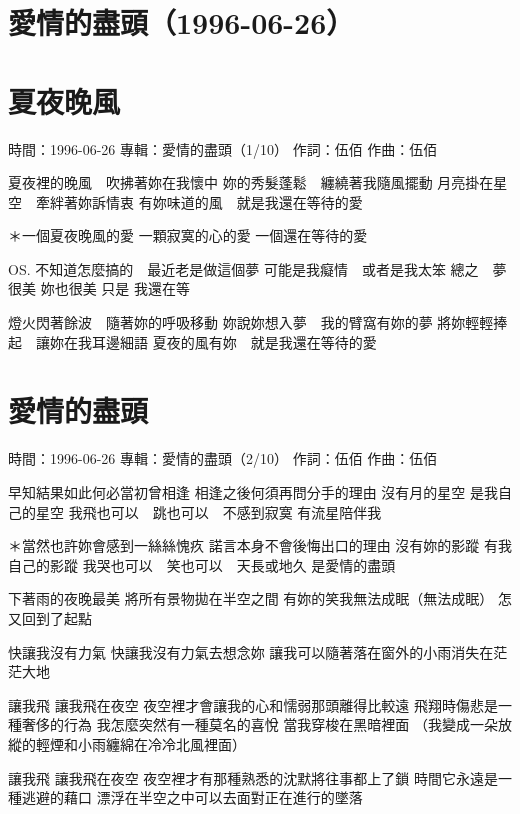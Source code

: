 \documentclass[UTF8,a4paper,oneside,twocolumn,12pt]{ctexbook}
\newcommand{\infopair}[2]{\textbullet #1：#2}
\newcommand{\zc}[1][伍佰]{\infopair{作詞}{#1}}
\newcommand{\zq}[1][伍佰]{\infopair{作曲}{#1}}
\newcommand{\zj}[1]{\infopair{專輯}{#1}}
\newcommand{\sj}[1]{\infopair{時間}{#1}}
\newenvironment{info}{\begin{flushleft}\kaishu
	}
	{\end{flushleft}\normalsize\yahei\par}
\newenvironment{lyric}{
	}
{}
\begin{document}
\section*{愛情的盡頭（1996-06-26）}
\section{夏夜晚風}
\begin{info}
	\sj{1996-06-26}
	\zj{愛情的盡頭（1/10）}
	\zc
	\zq
\end{info}
\begin{lyric}
	夏夜裡的晚風　吹拂著妳在我懷中
	妳的秀髮蓬鬆　纏繞著我隨風擺動
	月亮掛在星空　牽絆著妳訴情衷
	有妳味道的風　就是我還在等待的愛

	＊一個夏夜晚風的愛
	一顆寂寞的心的愛
	一個還在等待的愛

	OS.
	不知道怎麼搞的　最近老是做這個夢
	可能是我癡情　或者是我太笨
	總之　夢很美
	妳也很美
	只是
	我還在等

	燈火閃著餘波　隨著妳的呼吸移動
	妳說妳想入夢　我的臂窩有妳的夢
	將妳輕輕捧起　讓妳在我耳邊細語
	夏夜的風有妳　就是我還在等待的愛
\end{lyric}

\section{愛情的盡頭}
\begin{info}
	\sj{1996-06-26}
	\zj{愛情的盡頭（2/10）}
	\zc
	\zq
\end{info}
\begin{lyric}
	早知結果如此何必當初曾相逢
	相逢之後何須再問分手的理由
	沒有月的星空
	是我自己的星空
	我飛也可以　跳也可以　不感到寂寞
	有流星陪伴我

	＊當然也許妳會感到一絲絲愧疚
	諾言本身不會後悔出口的理由
	沒有妳的影蹤
	有我自己的影蹤
	我哭也可以　笑也可以　天長或地久
	是愛情的盡頭

	下著雨的夜晚最美
	將所有景物拋在半空之間
	有妳的笑我無法成眠（無法成眠）
	怎又回到了起點

	快讓我沒有力氣
	快讓我沒有力氣去想念妳
	讓我可以隨著落在窗外的小雨消失在茫茫大地

	讓我飛
	讓我飛在夜空
	夜空裡才會讓我的心和懦弱那頭離得比較遠
	飛翔時傷悲是一種奢侈的行為
	我怎麼突然有一種莫名的喜悅 當我穿梭在黑暗裡面
	（我變成一朵放縱的輕煙和小雨纏綿在冷冷北風裡面）

	讓我飛
	讓我飛在夜空
	夜空裡才有那種熟悉的沈默將往事都上了鎖
	時間它永遠是一種逃避的藉口
	漂浮在半空之中可以去面對正在進行的墜落
\end{lyric}
\end{document}
